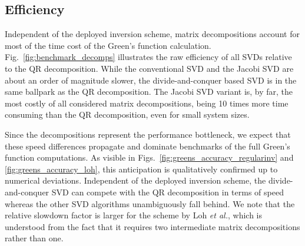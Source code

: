 \documentclass[%
 reprint,
superscriptaddress,
citeautoscript,
showpacs,
 amsmath,amssymb,
 aps,
 prb,
longbibliography,
]{revtex4-2}
\begin{document}
%		
%		
%		
%		
%		
%		
%		



\subsection{Efficiency}

Independent of the deployed inversion scheme, matrix decompositions account for most of the time cost of the Green's function calculation. Fig.~\ref{fig:benchmark_decomps} illustrates the raw efficiency of all SVDs relative to the QR decomposition. While the conventional SVD and the Jacobi SVD are about an order of magnitude slower, the divide-and-conquer based SVD is in the same ballpark as the QR decomposition. The Jacobi SVD variant is, by far, the most costly of all considered matrix decompositions, being 10 times more time consuming than the QR decomposition, even for small system sizes.

Since the decompositions represent the performance bottleneck, we expect that these speed differences propagate and dominate benchmarks of the full Green's function computations. As visible in Figs.~\ref{fig:greens_accuracy_regularinv} and \ref{fig:greens_accuracy_loh}, this anticipation is qualitatively confirmed up to numerical deviations. Independent of the deployed inversion scheme, the divide-and-conquer SVD can compete with the QR decomposition in terms of speed whereas the other SVD algorithms unambiguously fall behind. We note that the relative slowdown factor is larger for the scheme by Loh \textit{et al.}, which is understood from the fact that it requires two intermediate matrix decompositions rather than one.
\end{document}
